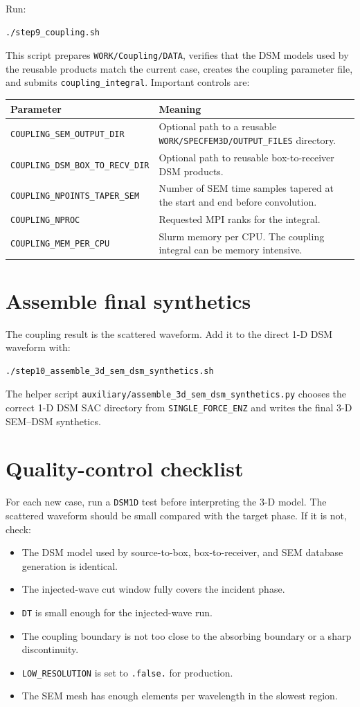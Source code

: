 \documentclass[11pt,oneside]{book}
\newcommand{\semdsm}{SEM--DSM}
\DeclareRobustCommand{\code}[1]{\nolinkurl{#1}}
\begin{document}
Run:
\begin{lstlisting}
./step9_coupling.sh
\end{lstlisting}
This script prepares \code{WORK/Coupling/DATA}, verifies that the DSM models
used by the reusable products match the current case, creates the coupling
parameter file, and submits \code{coupling_integral}. Important controls are:
\begin{longtable}{L{0.36\textwidth}L{0.55\textwidth}}
\toprule
Parameter & Meaning \\
\midrule
\code{COUPLING_SEM_OUTPUT_DIR} & Optional path to a reusable
\code{WORK/SPECFEM3D/OUTPUT_FILES} directory. \\
\code{COUPLING_DSM_BOX_TO_RECV_DIR} & Optional path to reusable box-to-receiver
DSM products. \\
\code{COUPLING_NPOINTS_TAPER_SEM} & Number of SEM time samples tapered at the
start and end before convolution. \\
\code{COUPLING_NPROC} & Requested MPI ranks for the integral. \\
\code{COUPLING_MEM_PER_CPU} & Slurm memory per CPU. The coupling integral can
be memory intensive. \\
\bottomrule
\end{longtable}

\section{Assemble final synthetics}

The coupling result is the scattered waveform. Add it to the direct 1-D DSM
waveform with:
\begin{lstlisting}
./step10_assemble_3d_sem_dsm_synthetics.sh
\end{lstlisting}
The helper script \code{auxiliary/assemble_3d_sem_dsm_synthetics.py} chooses
the correct 1-D DSM SAC directory from \code{SINGLE_FORCE_ENZ} and writes the
final 3-D \semdsm{} synthetics.

\section{Quality-control checklist}

For each new case, run a \code{DSM1D} test before interpreting the 3-D model.
The scattered waveform should be small compared with the target phase. If it
is not, check:
\begin{itemize}
  \item The DSM model used by source-to-box, box-to-receiver, and SEM database
  generation is identical.
  \item The injected-wave cut window fully covers the incident phase.
  \item \code{DT} is small enough for the injected-wave run.
  \item The coupling boundary is not too close to the absorbing boundary or a
  sharp discontinuity.
  \item \code{LOW_RESOLUTION} is set to \code{.false.} for production.
  \item The SEM mesh has enough elements per wavelength in the slowest region.
\end{itemize}
\end{document}
